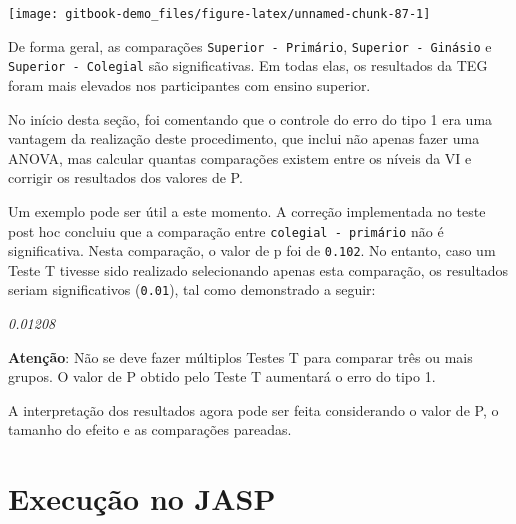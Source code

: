 \documentclass[
]{book}
\newenvironment{Shaded}{\begin{snugshade}}{\end{snugshade}}
\newcommand{\AttributeTok}[1]{\textcolor[rgb]{0.77,0.63,0.00}{#1}}
\newcommand{\FunctionTok}[1]{\textcolor[rgb]{0.00,0.00,0.00}{#1}}
\newcommand{\NormalTok}[1]{#1}
\newcommand{\SpecialCharTok}[1]{\textcolor[rgb]{0.00,0.00,0.00}{#1}}
\newcommand{\StringTok}[1]{\textcolor[rgb]{0.31,0.60,0.02}{#1}}
\begin{document}
\begin{center}\texttt{[image: gitbook-demo\_files/figure-latex/unnamed-chunk-87-1]} \end{center}

De forma geral, as comparações \texttt{Superior\ -\ Primário}, \texttt{Superior\ -\ Ginásio} e \texttt{Superior\ -\ Colegial} são significativas. Em todas elas, os resultados da TEG foram mais elevados nos participantes com ensino superior.

No início desta seção, foi comentando que o controle do erro do tipo 1 era uma vantagem da realização deste procedimento, que inclui não apenas fazer uma ANOVA, mas calcular quantas comparações existem entre os níveis da VI e corrigir os resultados dos valores de P.

Um exemplo pode ser útil a este momento. A correção implementada no teste post hoc concluiu que a comparação entre \texttt{colegial\ -\ primário} não é significativa. Nesta comparação, o valor de p foi de \texttt{0.102}. No entanto, caso um Teste T tivesse sido realizado selecionando apenas esta comparação, os resultados seriam significativos (\texttt{0.01}), tal como demonstrado a seguir:

\begin{Shaded}
\end{Shaded}

\emph{0.01208}

\textbf{Atenção}: Não se deve fazer múltiplos Testes T para comparar três ou mais grupos. O valor de P obtido pelo Teste T aumentará o erro do tipo 1.

A interpretação dos resultados agora pode ser feita considerando o valor de P, o tamanho do efeito e as comparações pareadas.

\hypertarget{execuuxe7uxe3o-no-jasp-7}{%
\section{Execução no JASP}\label{execuuxe7uxe3o-no-jasp-7}}
\end{document}
